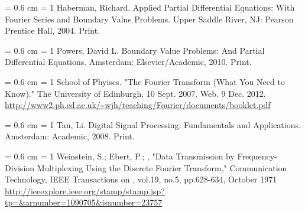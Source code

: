\documentclass[12pt]{article}
\begin{document}
\vspace{0.3 cm} \noindent \hangindent = 0.6 cm \hangafter = 1 Haberman,
Richard. Applied Partial Differential Equations: With Fourier Series and
Boundary Value Problems. Upper Saddle River, NJ: Pearson Prentice Hall, 2004.
Print.

\vspace{0.3 cm} \noindent \hangindent = 0.6 cm \hangafter = 1 Powers, David L.
Boundary Value Problems: And Partial Differential Equations. Amsterdam:
Elsevier/Academic, 2010. Print.

\vspace{0.3 cm} \noindent \hangindent = 0.6 cm \hangafter = 1 School of
Phyiscs. "The Fourier Transform (What You Need to Know)." The University of
Edinburgh, 10 Sept. 2007. Web. 9 Dec. 2012.
\url{http://www2.ph.ed.ac.uk/~wjh/teaching/Fourier/documents/booklet.pdf}

\vspace{0.3 cm} \noindent \hangindent = 0.6 cm \hangafter = 1 Tan, Li. Digital
Signal Processing: Fundamentals and Applications. Amsterdam: Academic, 2008.
Print.

\vspace{0.3 cm} \noindent \hangindent = 0.6 cm \hangafter = 1 Weinstein, S.;
Ebert, P.; , "Data Transmission by Frequency-Division Multiplexing Using the
Discrete Fourier Transform," Communication Technology, IEEE Transactions on ,
vol.19, no.5, pp.628-634, October 1971
\url{http://ieeexplore.ieee.org/stamp/stamp.jsp?tp=&arnumber=1090705&isnumber=23757}
\end{document}
